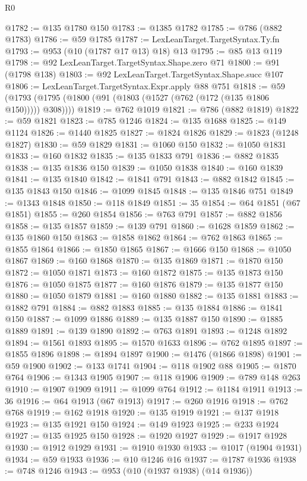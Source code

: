 \begin{lexlean}{R0}
\begin{coremodule}
@1782 := @135 @1780 @150
@1783 := @1385 @1782
@1785 := @786 (@882 @1783)
@1786 := @59 @1785
@1787 := LexLeanTarget.TargetSyntax.Ty.fn
@1793 := @953 (@10 (@1787 @17 @13) @18) @13
@1795 := @85 @13 @119
@1798 := @92 LexLeanTarget.TargetSyntax.Shape.zero @71
@1800 := @91 (@1798 @138)
@1803 := @92 LexLeanTarget.TargetSyntax.Shape.succ @107
@1806 := LexLeanTarget.TargetSyntax.Expr.apply @88 @751
@1818 := @59 (@1793 (@1795 (@1800 (@91 (@1803 (@1527 (@762 (@172 (@135 @1806 @150))))) @308))))
@1819 := @762 @1019
@1821 := @786 (@882 @1819)
@1822 := @59 @1821
@1823 := @785 @1246
@1824 := @135 @1688
@1825 := @149 @1124
@1826 := @1440 @1825
@1827 := @1824 @1826
@1829 := @1823 (@1248 @1827)
@1830 := @59 @1829
@1831 := @1060 @150
@1832 := @1050 @1831
@1833 := @160 @1832
@1835 := @135 @1833 @791
@1836 := @882 @1835
@1838 := @135 @1836 @150
@1839 := @1050 @1838
@1840 := @160 @1839
@1841 := @135 @1840
@1842 := @1841 @791
@1843 := @882 @1842
@1845 := @135 @1843 @150
@1846 := @1099 @1845
@1848 := @135 @1846 @751
@1849 := @1343 @1848
@1850 := @118 @1849
@1851 := 35
@1854 := @64 @1851 (@67 @1851)
@1855 := @260 @1854
@1856 := @763 @791
@1857 := @882 @1856
@1858 := @135 @1857
@1859 := @139 @791
@1860 := @1628 @1859
@1862 := @135 @1860 @150
@1863 := @1858 @1862
@1864 := @762 @1863
@1865 := @1855 @1864
@1866 := @1850 @1865
@1867 := @1666 @150
@1868 := @1050 @1867
@1869 := @160 @1868
@1870 := @135 @1869
@1871 := @1870 @150
@1872 := @1050 @1871
@1873 := @160 @1872
@1875 := @135 @1873 @150
@1876 := @1050 @1875
@1877 := @160 @1876
@1879 := @135 @1877 @150
@1880 := @1050 @1879
@1881 := @160 @1880
@1882 := @135 @1881
@1883 := @1882 @791
@1884 := @882 @1883
@1885 := @135 @1884
@1886 := @1841 @150
@1887 := @1099 @1886
@1889 := @135 @1887 @150
@1890 := @1885 @1889
@1891 := @139 @1890
@1892 := @763 @1891
@1893 := @1248 @1892
@1894 := @1561 @1893
@1895 := @1570 @1633
@1896 := @762 @1895
@1897 := @1855 @1896
@1898 := @1894 @1897
@1900 := @1476 (@1866 @1898)
@1901 := @59 @1900
@1902 := @133 @1741
@1904 := @118 @1902 @88
@1905 := @1870 @764
@1906 := @1343 @1905
@1907 := @118 @1906
@1909 := @789 @148 @263
@1910 := @1907 @1909
@1911 := @1099 @764
@1912 := @1184 @1911
@1913 := 36
@1916 := @64 @1913 (@67 @1913)
@1917 := @260 @1916
@1918 := @762 @768
@1919 := @162 @1918
@1920 := @135 @1919
@1921 := @137 @1918
@1923 := @135 @1921 @150
@1924 := @149 @1923
@1925 := @233 @1924
@1927 := @135 @1925 @150
@1928 := @1920 @1927
@1929 := @1917 @1928
@1930 := @1912 @1929
@1931 := @1910 @1930
@1933 := @1017 (@1904 @1931)
@1934 := @59 @1933
@1936 := @10 @1246 @16
@1937 := @1787 @1936
@1938 := @748 @1246
@1943 := @953 (@10 (@1937 @1938) (@14 @1936))

\end{coremodule}
\end{lexlean}
